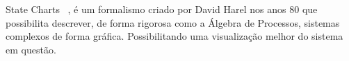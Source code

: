 State Charts ~\cite{Harel:1987:SVF:34884.34886}, é um formalismo criado por David Harel nos anos 80 que possibilita descrever, de forma rigorosa como a Álgebra de Processos, sistemas complexos de forma gráfica. Possibilitando uma visualização melhor do sistema em questão.

\lipsum[1]
~\cite{Harel:1987:SVF:34884.34886}
